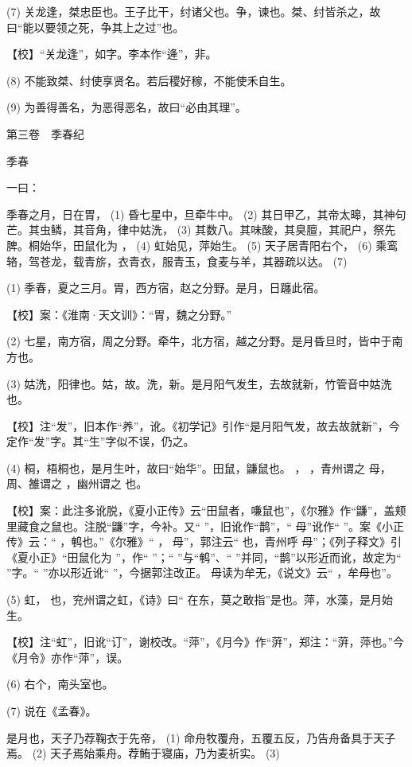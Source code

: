 \documentclass[12pt,UTF8]{ctexbook}
\begin{document}
(7) 关龙逢，桀忠臣也。王子比干，纣诸父也。争，谏也。桀、纣皆杀之，故曰“能以要领之死，争其上之过”也。

【校】“关龙逢”，如字。李本作“逄”，非。

(8) 不能致桀、纣使享贤名。若后稷好稼，不能使禾自生。

(9) 为善得善名，为恶得恶名，故曰“必由其理”。





第三卷　季春纪



季春


一曰：

季春之月，日在胃， (1) 昏七星中，旦牵牛中。 (2) 其日甲乙，其帝太暤，其神句芒。其虫鳞，其音角，律中姑洗， (3) 其数八。其味酸，其臭膻，其祀户，祭先脾。桐始华，田鼠化为 ， (4) 虹始见，萍始生。 (5) 天子居青阳右个， (6) 乘鸾辂，驾苍龙，载青旂，衣青衣，服青玉，食麦与羊，其器疏以达。 (7)

(1) 季春，夏之三月。胃，西方宿，赵之分野。是月，日躔此宿。

【校】案：《淮南·天文训》：“胃，魏之分野。”

(2) 七星，南方宿，周之分野。牵牛，北方宿，越之分野。是月昏旦时，皆中于南方也。

(3) 姑洗，阳律也。姑，故。洗，新。是月阳气发生，去故就新，竹管音中姑洗也。

【校】注“发”，旧本作“养”，讹。《初学记》引作“是月阳气发，故去故就新”，今定作“发”字。其“生”字似不误，仍之。

(4) 桐，梧桐也，是月生叶，故曰“始华”。田鼠，鼸鼠也。 ， ，青州谓之 母，周、雒谓之 ，幽州谓之 也。

【校】案：此注多讹脱，《夏小正传》云“田鼠者，嗛鼠也”，《尔雅》作“鼸”，盖颊里藏食之鼠也。注脱“鼸”字，今补。又“ ”，旧讹作“鹊”，“ 母”讹作“ ”。案《小正传》云：“ ，鹌也。”《尔雅》“ ， 母”，郭注云“ 也，青州呼 母”；《列子释文》引《夏小正》“田鼠化为 ”，作“ ”；“ ”与“鹌”、“ ”并同，“鹊”以形近而讹，故定为“ ”字。“ ”亦以形近讹“ ”，今据郭注改正。 母读为牟无，《说文》云“ ，牟母也”。

(5) 虹， 也，兖州谓之虹，《诗》曰“ 在东，莫之敢指”是也。萍，水藻，是月始生。

【校】注“虹”，旧讹“订”，谢校改。“萍”，《月今》作“蓱”，郑注：“蓱，萍也。”今《月令》亦作“萍”，误。

(6) 右个，南头室也。

(7) 说在《孟春》。

是月也，天子乃荐鞠衣于先帝， (1) 命舟牧覆舟，五覆五反，乃告舟备具于天子焉。 (2) 天子焉始乘舟。荐鲔于寝庙，乃为麦祈实。 (3)
\end{document}
